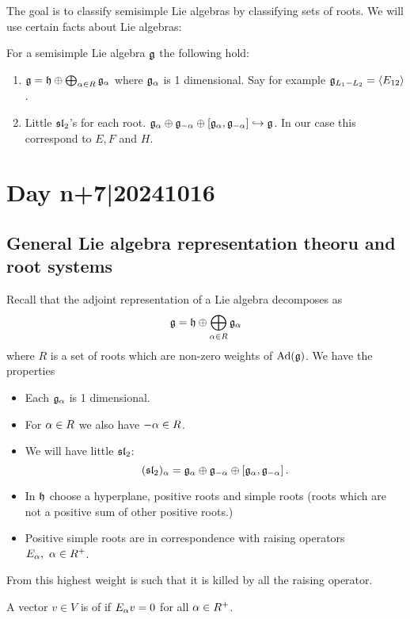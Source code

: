 \documentclass[12pt]{memoir}
\begin{document}
The goal is to classify semisimple Lie algebras by classifying sets of roots. We will use certain facts about Lie algebras:

\begin{Prop}
    For a semisimple Lie algebra $\mathfrak{g}$ the following hold:
    \begin{enumerate}
        \item $\mathfrak{g}=\mathfrak{h}\oplus\bigoplus_{\alpha\in R}\mathfrak{g}_\alpha$ where $\mathfrak{g}_\alpha$ is 1 dimensional. Say for example $\mathfrak{g}_{L_1-L_2}=\left\langle E_{12}\right\rangle$.
        \item Little $\mathfrak{sl}_2$'s for each root. $\mathfrak{g}_\alpha\oplus\mathfrak{g}_{-\alpha}\oplus\left\lbrack\mathfrak{g}_\alpha,\mathfrak{g}_{-\alpha}\right\rbrack\hookrightarrow\mathfrak{g}$. In our case this correspond to $E,F$ and $H$.
    \end{enumerate}
\end{Prop}

\section{Day n+7|20241016}

\subsection{General Lie algebra representation theoru and root systems}

Recall that the adjoint representation of a Lie algebra decomposes as 
$$\mathfrak{g}=\mathfrak{h}\oplus\bigoplus_{\alpha\in R}\mathfrak{g}_\alpha$$
where $R$ is a set of roots which are non-zero weights of $\operatorname{Ad}(\mathfrak{g})$. We have the properties
\begin{itemize}
    \item Each $\mathfrak{g}_\alpha$ is 1 dimensional.
    \item For $\alpha\in R$ we also have $-\alpha\in R$.
    \item We will have little $\mathfrak{sl}_2$:
    $$(\mathfrak{sl}_2)_\alpha=\mathfrak{g}_\alpha\oplus\mathfrak{g}_{-\alpha}\oplus\left\lbrack\mathfrak{g}_\alpha,\mathfrak{g}_{-\alpha}\right\rbrack.$$
    \item In $\mathfrak{h}$ choose a hyperplane, positive roots and simple roots (roots which are not a positive sum of other positive roots.)
    \item Positive simple roots are in correspondence with raising operators $E_\alpha,\ \alpha\in R^+$.
\end{itemize}

From this highest weight is such that it is killed by all the raising operator.

\begin{Def}
    A vector $v\in V$ is of  if $E_\alpha v=0$ for all $\alpha\in R^+$.
\end{Def}
\end{document}
